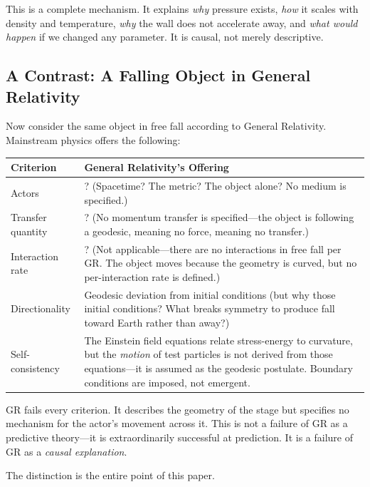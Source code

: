\documentclass[12pt, a4paper]{article}
\begin{document}
This is a complete mechanism. It explains \textit{why} pressure exists, \textit{how} it scales with density and temperature, \textit{why} the wall does not accelerate away, and \textit{what would happen} if we changed any parameter. It is causal, not merely descriptive.

\subsection{A Contrast: A Falling Object in General Relativity}
\label{subsec:GR_falling}

Now consider the same object in free fall according to General Relativity. Mainstream physics offers the following:

\begin{center}
\begin{tabular}{|p{3cm}|p{10cm}|}
\hline
\textbf{Criterion} & \textbf{General Relativity's Offering} \\
\hline
Actors & ? (Spacetime? The metric? The object alone? No medium is specified.) \\
\hline
Transfer quantity & ? (No momentum transfer is specified—the object is following a geodesic, meaning no force, meaning no transfer.) \\
\hline
Interaction rate & ? (Not applicable—there are no interactions in free fall per GR. The object moves because the geometry is curved, but no per-interaction rate is defined.) \\
\hline
Directionality & Geodesic deviation from initial conditions (but why those initial conditions? What breaks symmetry to produce fall toward Earth rather than away?) \\
\hline
Self-consistency & The Einstein field equations relate stress-energy to curvature, but the \textit{motion} of test particles is not derived from those equations—it is assumed as the geodesic postulate. Boundary conditions are imposed, not emergent. \\
\hline
\end{tabular}
\end{center}

GR fails every criterion. It describes the geometry of the stage but specifies no mechanism for the actor's movement across it. This is not a failure of GR as a predictive theory—it is extraordinarily successful at prediction. It is a failure of GR as a \textit{causal explanation}.

The distinction is the entire point of this paper.
\end{document}
